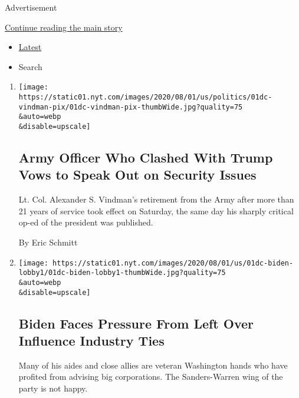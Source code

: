 Advertisement

\protect\hyperlink{after-mid1}{Continue reading the main story}

\begin{itemize}
\tightlist
\item
  \protect\hyperlink{stream-panel}{Latest}
\item
  Search
\end{itemize}

\begin{enumerate}
\def\labelenumi{\arabic{enumi}.}
\item
  \href{/2020/08/01/us/politics/alexander-vindman-impeachment-trump.html}{}

  \texttt{[image: https://static01.nyt.com/images/2020/08/01/us/politics/01dc-vindman-pix/01dc-vindman-pix-thumbWide.jpg?quality=75\\\&auto=webp\\\&disable=upscale]}

  \hypertarget{army-officer-who-clashed-with-trump-vows-to-speak-out-on-security-issues}{%
  \subsection{Army Officer Who Clashed With Trump Vows to Speak Out on
  Security
  Issues}\label{army-officer-who-clashed-with-trump-vows-to-speak-out-on-security-issues}}

  Lt. Col. Alexander S. Vindman's retirement from the Army after more
  than 21 years of service took effect on Saturday, the same day his
  sharply critical op-ed of the president was published.

  By Eric Schmitt
\item
  \href{/2020/08/01/us/politics/biden-lobbyist-ties.html}{}

  \texttt{[image: https://static01.nyt.com/images/2020/08/01/us/01dc-biden-lobby1/01dc-biden-lobby1-thumbWide.jpg?quality=75\\\&auto=webp\\\&disable=upscale]}

  \hypertarget{biden-faces-pressure-from-left-over-influence-industry-ties}{%
  \subsection{Biden Faces Pressure From Left Over Influence Industry
  Ties}\label{biden-faces-pressure-from-left-over-influence-industry-ties}}

  Many of his aides and close allies are veteran Washington hands who
  have profited from advising big corporations. The Sanders-Warren wing
  of the party is not happy.


\end{enumerate}
